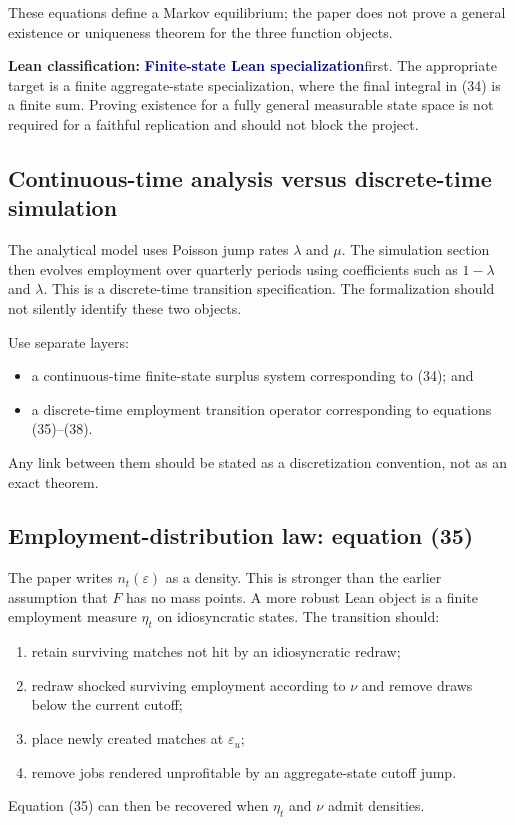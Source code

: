 \documentclass[11pt]{article}
\newcommand{\epsu}{\varepsilon_u}
\newcommand{\leanclass}[1]{\textbf{Lean classification:} #1}
\newcommand{\finite}{\textcolor{navy}{\textbf{Finite-state Lean specialization}}}
\begin{document}
These equations define a Markov equilibrium; the paper does not prove a general existence or uniqueness theorem for the three function objects.

\leanclass{\finite first.}
The appropriate target is a finite aggregate-state specialization, where the final integral in (34) is a finite sum. Proving existence for a fully general measurable state space is not required for a faithful replication and should not block the project.

\subsection{Continuous-time analysis versus discrete-time simulation}

The analytical model uses Poisson jump rates $\lambda$ and $\mu$. The simulation section then evolves employment over quarterly periods using coefficients such as $1-\lambda$ and $\lambda$. This is a discrete-time transition specification. The formalization should not silently identify these two objects.

Use separate layers:
\begin{itemize}
\item a continuous-time finite-state surplus system corresponding to (34); and
\item a discrete-time employment transition operator corresponding to equations (35)--(38).
\end{itemize}
Any link between them should be stated as a discretization convention, not as an exact theorem.

\subsection{Employment-distribution law: equation (35)}

The paper writes $n_t(\varepsilon)$ as a density. This is stronger than the earlier assumption that $F$ has no mass points. A more robust Lean object is a finite employment measure $\eta_t$ on idiosyncratic states. The transition should:
\begin{enumerate}
\item retain surviving matches not hit by an idiosyncratic redraw;
\item redraw shocked surviving employment according to $\nu$ and remove draws below the current cutoff;
\item place newly created matches at $\epsu$;
\item remove jobs rendered unprofitable by an aggregate-state cutoff jump.
\end{enumerate}
Equation (35) can then be recovered when $\eta_t$ and $\nu$ admit densities.
\end{document}
